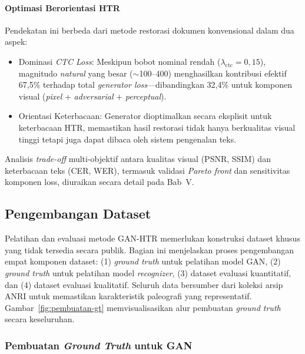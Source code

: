 \documentclass[12pt,a4paper]{article}
\begin{document}
\paragraph{Optimasi Berorientasi HTR}

Pendekatan ini berbeda dari metode restorasi dokumen konvensional dalam dua aspek:
\begin{itemize}[noitemsep, topsep=0pt, partopsep=0pt, leftmargin=1.5em]
  \item Dominasi \textit{CTC Loss}: Meskipun bobot nominal rendah ($\lambda_{\text{ctc}}=0,15$), magnitudo \textit{natural} yang besar ($\sim$100--400) menghasilkan kontribusi efektif 67,5\% terhadap total \textit{generator loss}---dibandingkan 32,4\% untuk komponen visual (\textit{pixel} + \textit{adversarial} + \textit{perceptual}).
  \item Orientasi Keterbacaan: Generator dioptimalkan secara eksplisit untuk keterbacaan HTR, memastikan hasil restorasi tidak hanya berkualitas visual tinggi tetapi juga dapat dibaca oleh sistem pengenalan teks.
\end{itemize}

\noindent Analisis \textit{trade-off} multi-objektif antara kualitas visual (PSNR, SSIM) dan keterbacaan teks (CER, WER), termasuk validasi \textit{Pareto front} dan sensitivitas komponen loss, diuraikan secara detail pada Bab~V.



\subsection{Pengembangan Dataset}
\label{sec:pengembangan-dataset}

Pelatihan dan evaluasi metode GAN-HTR memerlukan konstruksi dataset khusus yang tidak tersedia secara publik. Bagian ini menjelaskan proses pengembangan empat komponen dataset: (1) \textit{ground truth} untuk pelatihan model GAN, (2) \textit{ground truth} untuk pelatihan model \textit{recognizer}, (3) dataset evaluasi kuantitatif, dan (4) dataset evaluasi kualitatif. Seluruh data bersumber dari koleksi arsip ANRI untuk memastikan karakteristik paleografi yang representatif. Gambar~\ref{fig:pembuatan-gt} memvisualisasikan alur pembuatan \textit{ground truth} secara keseluruhan.

\subsubsection{Pembuatan \textit{Ground Truth} untuk GAN}
\end{document}
